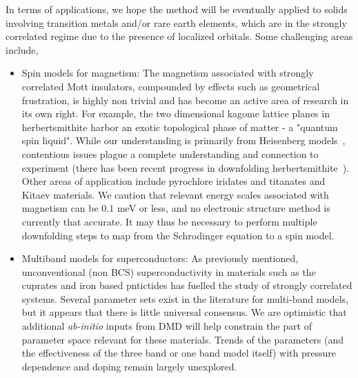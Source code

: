 In terms of applications, we hope the method will be eventually applied to solids involving transition 
metals and/or rare earth elements, which are in the strongly correlated regime due to the presence of localized orbitals. 
Some challenging areas include,
\begin{itemize} 
	\item Spin models for magnetism: 
	The magnetism associated with strongly correlated Mott insulators, compounded by effects such as geometrical frustration, 
	is highly non trivial and has become an active area of research in its own right. 
	For example, the two dimensional kagome lattice planes in 
	herbertsmithite harbor an exotic topological phase of matter - a "quantum spin liquid". While our understanding is primarily 
	from Heisenberg models~\cite{Yan_Huse_White, Changlani_kagome}, 
	contentious issues plague a complete understanding and connection to experiment (there has been recent progress 
	in downfolding herbertsmithite~\cite{Jeschke}). 
	Other areas of application include pyrochlore iridates and titanates and Kitaev materials. 
	We caution that relevant energy scales associated with magnetism can be $0.1$ meV or less, and no electronic structure 
	method is currently that accurate. It may thus be necessary to perform multiple downfolding steps to map from 
	the Schrodinger equation to a spin model.
	\item Multiband models for superconductors:
	As previously mentioned, unconventional (non BCS) superconductivity in materials such as the cuprates and iron based 
	pntictides has fuelled the study of strongly correlated systems.
	Several parameter sets exist in the literature for multi-band models, but it appears that there is little universal consensus. 
	We are optimistic that additional \emph{ab-initio} inputs from DMD will help constrain the part of parameter 
	space relevant for these materials. Trends of the parameters (and the effectiveness of the three band 
	or one band model itself) with pressure dependence and doping remain largely unexplored.  
\end{itemize} 

